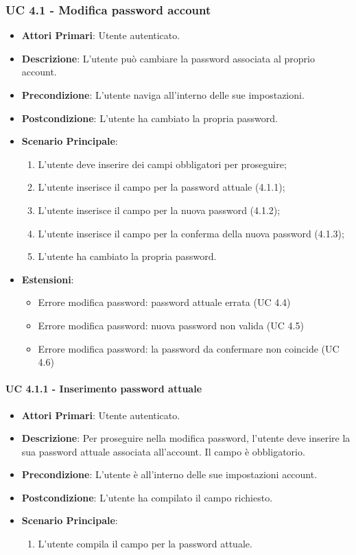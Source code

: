 			\subsubsection{UC 4.1 - Modifica password account}
			\begin{itemize}
				\item \textbf{Attori Primari}: Utente autenticato.
				\item \textbf{Descrizione}: L'utente può cambiare la password associata al proprio account.
				\item \textbf{Precondizione}: L'utente naviga all'interno delle sue impostazioni.
				\item \textbf{Postcondizione}: L'utente ha cambiato la propria password.
				\item \textbf{Scenario Principale}:
				\begin{enumerate}
					\item L'utente deve inserire dei campi obbligatori per proseguire;
					\item L'utente inserisce il campo per la password attuale (4.1.1);
					\item L'utente inserisce il campo per la nuova password (4.1.2);
					\item L'utente inserisce il campo per la conferma della nuova password (4.1.3);
					\item L'utente ha cambiato la propria password.
				\end{enumerate}	
				\item \textbf{Estensioni}:
					\begin{itemize}
						\item Errore modifica password: password attuale errata (UC 4.4)
						\item Errore modifica password: nuova password non valida (UC 4.5)
						\item Errore modifica password: la password da confermare non coincide (UC 4.6)
					\end{itemize}
			\end{itemize}

				\paragraph{UC 4.1.1 - Inserimento password attuale}
				\begin{itemize}
					\item \textbf{Attori Primari}: Utente autenticato.
					\item \textbf{Descrizione}: Per proseguire nella modifica password, l'utente deve inserire la sua password attuale associata all'account. Il campo è obbligatorio.
					\item \textbf{Precondizione}: L'utente è all'interno delle sue impostazioni account.
					\item \textbf{Postcondizione}: L'utente ha compilato il campo richiesto.
					\item \textbf{Scenario Principale}:
					\begin{enumerate}
						\item L'utente compila il campo per la password attuale.
					\end{enumerate}
				\end{itemize}

